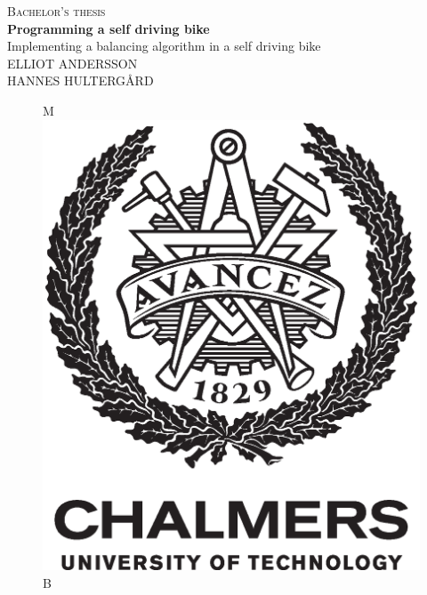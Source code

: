 \newpage
\thispagestyle{empty}
\begin{center}
	\textsc{\large Bachelor's thesis \the\year}\\[4cm]
	\textbf{\Large Programming a self driving bike} \\[1cm]
	{\large Implementing a balancing algorithm in a self driving bike}\\[1cm]
	{\large ELLIOT ANDERSSON}\\
	{\large HANNES HULTERGÅRD}
	
	\vfill	
	\begin{figure}[H]
	\centering
	\if\ThesisType M
    \includegraphics[width=0.2\pdfpagewidth]{figure/auxiliary/AvancezChalmersU_black_centered.eps} \\
    \fi
    \if\ThesisType B

\end{figure}
\end{center}

